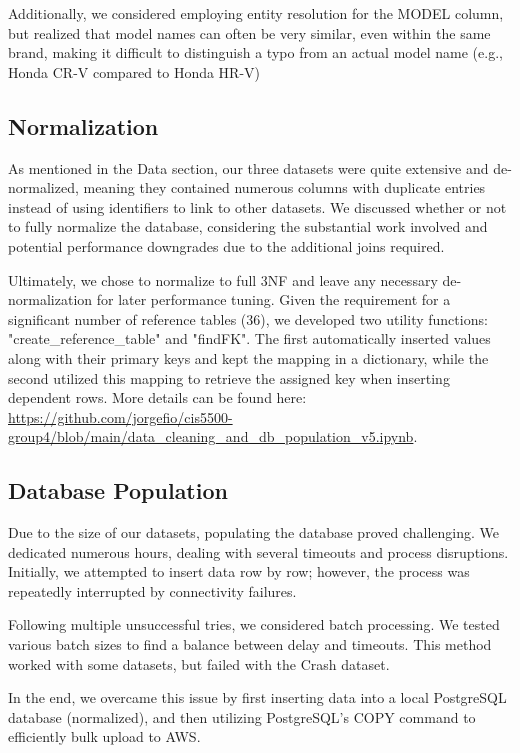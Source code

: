 \documentclass[12pt]{article}
\begin{document}
Additionally, we considered employing entity resolution for the MODEL column, but realized that model names can often be very similar, even within the same brand, making it difficult to distinguish a typo from an actual model name (e.g., Honda CR-V compared to Honda HR-V)

\subsection{Normalization}

As mentioned in the Data section, our three datasets were quite extensive and de-normalized, meaning they contained numerous columns with duplicate entries instead of using identifiers to link to other datasets. We discussed whether or not to fully normalize the database, considering the substantial work involved and potential performance downgrades due to the additional joins required. 

Ultimately, we chose to normalize to full 3NF and leave any necessary de-normalization for later performance tuning. Given the requirement for a significant number of reference tables (36), we developed two utility functions: "create\_reference\_table" and "findFK". The first automatically inserted values along with their primary keys and kept the mapping in a dictionary, while the second utilized this mapping to retrieve the assigned key when inserting dependent rows. More details can be found here: \url{https://github.com/jorgefio/cis5500-group4/blob/main/data_cleaning_and_db_population_v5.ipynb}.

\subsection{Database Population}

Due to the size of our datasets, populating the database proved challenging. We dedicated numerous hours, dealing with several timeouts and process disruptions. Initially, we attempted to insert data row by row; however, the process was repeatedly interrupted by connectivity failures.

Following multiple unsuccessful tries, we considered batch processing. We tested various batch sizes to find a balance between delay and timeouts. This method worked with some datasets, but failed with the Crash dataset.

In the end, we overcame this issue by first inserting data into a local PostgreSQL database (normalized), and then utilizing PostgreSQL's COPY command to efficiently bulk upload to AWS.
\end{document}
